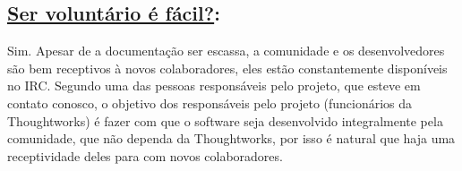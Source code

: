 \subsection*{\underline{Ser voluntário é fácil?}:}

Sim. Apesar de a documentação ser escassa, a comunidade e os desenvolvedores são bem receptivos à novos colaboradores, eles estão constantemente disponíveis no IRC.
Segundo uma das pessoas responsáveis pelo projeto, que esteve em contato conosco, o objetivo dos responsáveis pelo projeto (funcionários da Thoughtworks) é fazer com que o software seja desenvolvido integralmente pela comunidade, que não dependa da Thoughtworks, por isso é natural que haja uma receptividade deles para com novos colaboradores.
